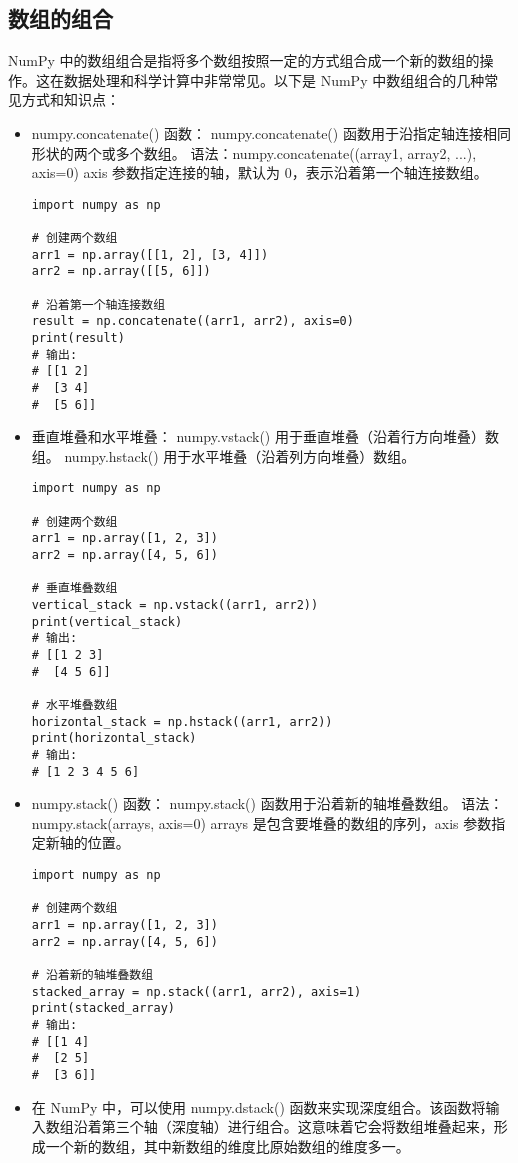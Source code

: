 \documentclass{article}
\begin{document}
\subsection{数组的组合}
NumPy 中的数组组合是指将多个数组按照一定的方式组合成一个新的数组的操作。这在数据处理和科学计算中非常常见。以下是 NumPy 中数组组合的几种常见方式和知识点：
\begin{itemize}
    \item numpy.concatenate() 函数：
    numpy.concatenate() 函数用于沿指定轴连接相同形状的两个或多个数组。
    语法：numpy.concatenate((array1, array2, ...), axis=0)
axis 参数指定连接的轴，默认为 0，表示沿着第一个轴连接数组。
\begin{lstlisting}[caption={示例Python代码}]
import numpy as np

# 创建两个数组
arr1 = np.array([[1, 2], [3, 4]])
arr2 = np.array([[5, 6]])

# 沿着第一个轴连接数组
result = np.concatenate((arr1, arr2), axis=0)
print(result)
# 输出:
# [[1 2]
#  [3 4]
#  [5 6]]
\end{lstlisting}
\item 垂直堆叠和水平堆叠：
numpy.vstack() 用于垂直堆叠（沿着行方向堆叠）数组。
numpy.hstack() 用于水平堆叠（沿着列方向堆叠）数组。
\begin{lstlisting}[caption={示例Python代码}]
import numpy as np

# 创建两个数组
arr1 = np.array([1, 2, 3])
arr2 = np.array([4, 5, 6])

# 垂直堆叠数组
vertical_stack = np.vstack((arr1, arr2))
print(vertical_stack)
# 输出:
# [[1 2 3]
#  [4 5 6]]

# 水平堆叠数组
horizontal_stack = np.hstack((arr1, arr2))
print(horizontal_stack)
# 输出:
# [1 2 3 4 5 6]
\end{lstlisting}
\item numpy.stack() 函数：
numpy.stack() 函数用于沿着新的轴堆叠数组。
语法：numpy.stack(arrays, axis=0)
arrays 是包含要堆叠的数组的序列，axis 参数指定新轴的位置。
\begin{lstlisting}[caption={示例Python代码}]
import numpy as np

# 创建两个数组
arr1 = np.array([1, 2, 3])
arr2 = np.array([4, 5, 6])

# 沿着新的轴堆叠数组
stacked_array = np.stack((arr1, arr2), axis=1)
print(stacked_array)
# 输出:
# [[1 4]
#  [2 5]
#  [3 6]]
\end{lstlisting}



\item 在 NumPy 中，可以使用 numpy.dstack() 函数来实现深度组合。该函数将输入数组沿着第三个轴（深度轴）进行组合。这意味着它会将数组堆叠起来，形成一个新的数组，其中新数组的维度比原始数组的维度多一。


\end{itemize}
\end{document}
